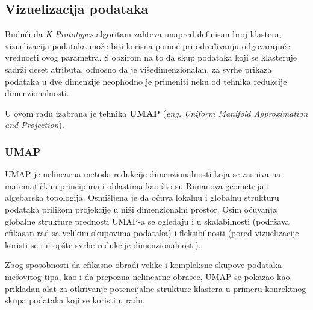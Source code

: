 \documentclass[a4paper,12pt]{article}
\begin{document}
\subsection{Vizuelizacija podataka}
Budući da \textit{K-Prototypes} algoritam zahteva unapred definisan broj klastera, vizuelizacija podataka može biti korisna pomoć pri određivanju odgovarajuće vrednosti ovog parametra. S obzirom na to da skup podataka koji se klasteruje sadrži deset atributa, odnosno da je višedimenzionalan, za svrhe prikaza podataka u dve dimenzije neophodno je primeniti neku od tehnika redukcije dimenzionalnosti.

U ovom radu izabrana je tehnika \textbf{UMAP} (\textit{eng. Uniform Manifold Approximation and Projection}).
\subsubsection{UMAP}
UMAP je nelinearna metoda redukcije dimenzionalnosti koja se zasniva na matematičkim principima i oblastima kao što su Rimanova geometrija i algebarska topologija. Osmišljena je da očuva lokalnu i globalnu strukturu podataka prilikom projekcije u niži dimenzionalni prostor. Osim očuvanja globalne strukture prednosti UMAP-a se ogledaju i u skalabilnosti (podržava efikasan rad sa velikim skupovima podataka) i fleksibilnosti (pored vizuelizacije koristi se i u opšte svrhe redukcije dimenzionalnosti).

Zbog sposobnosti da efikasno obradi velike i kompleksne skupove podataka mešovitog tipa, kao i da prepozna nelinearne obrasce, UMAP se pokazao kao prikladan alat za otkrivanje potencijalne strukture klastera u primeru konrektnog skupa podataka koji se koristi u radu.
\end{document}
